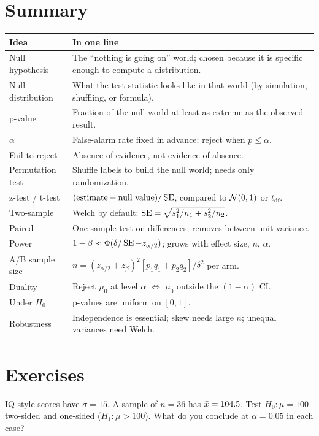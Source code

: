 \section{Summary}

\begin{center}
\small
\begin{tabular}{p{3.4cm}p{9.6cm}}
\toprule
Idea & In one line\\
\midrule
Null hypothesis & The ``nothing is going on'' world; chosen because it is specific enough to compute a distribution.\\
Null distribution & What the test statistic looks like in that world (by simulation, shuffling, or formula).\\
p-value & Fraction of the null world at least as extreme as the observed result.\\
$\alpha$ & False-alarm rate fixed in advance; reject when $p\le\alpha$.\\
Fail to reject & Absence of evidence, not evidence of absence.\\
Permutation test & Shuffle labels to build the null world; needs only randomization.\\
z-test / t-test & $(\text{estimate} - \text{null value})/\operatorname{SE}$, compared to $\mathcal{N}(0,1)$ or $t_{\text{df}}$.\\
Two-sample & Welch by default: $\operatorname{SE}=\sqrt{s_1^2/n_1+s_2^2/n_2}$.\\
Paired & One-sample test on differences; removes between-unit variance.\\
Power & $1-\beta\approx\Phi(\delta/\operatorname{SE} - z_{\alpha/2})$; grows with effect size, $n$, $\alpha$.\\
A/B sample size & $n=(z_{\alpha/2}+z_\beta)^2[p_1q_1+p_2q_2]/\delta^2$ per arm.\\
Duality & Reject $\mu_0$ at level $\alpha$ $\iff$ $\mu_0$ outside the $(1-\alpha)$ CI.\\
Under $H_0$ & p-values are uniform on $[0,1]$.\\
Robustness & Independence is essential; skew needs large $n$; unequal variances need Welch.\\
\bottomrule
\end{tabular}
\end{center}

\section{Exercises}

\begin{exercise}
IQ-style scores have $\sigma=15$. A sample of $n=36$ has $\bar{x}=104.5$. Test
$H_0\colon\mu=100$ two-sided and one-sided ($H_1\colon\mu>100$). What do you conclude at
$\alpha=0.05$ in each case?
\end{exercise}


